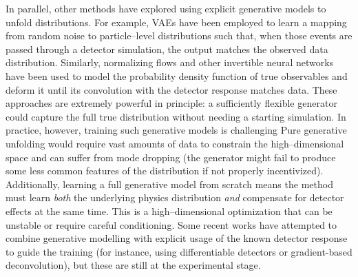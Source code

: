         In parallel, other methods have explored using explicit generative models to unfold distributions.
        For example, VAEs have been employed to learn a mapping from random noise to particle--level distributions such that, when those events are passed through a detector simulation, the output matches the observed data distribution.
        Similarly, normalizing flows and other invertible neural networks have been used to model the probability density function of true observables and deform it until its convolution with the detector response matches data.
        These approaches are extremely powerful in principle: a sufficiently flexible generator could capture the full true distribution without needing a starting simulation.
        In practice, however, training such generative models is challenging
        Pure generative unfolding would require vast amounts of data to constrain the high--dimensional space and can suffer from mode dropping (the generator might fail to produce some less common features of the distribution if not properly incentivized).
        Additionally, learning a full generative model from scratch means the method must learn \emph{both} the underlying physics distribution \emph{and} compensate for detector effects at the same time.
        This is a high--dimensional optimization that can be unstable or require careful conditioning.
        Some recent works have attempted to combine generative modelling with explicit usage of the known detector response to guide the training (for instance, using differentiable detectors or gradient-based deconvolution), but these are still at the experimental stage.


